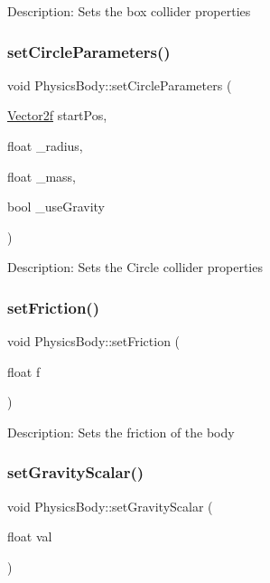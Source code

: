Description\+: Sets the box collider properties \mbox{\label{class_physics_body_a8c100c20b5a7777ba0d22886ecf878fe}} 
\subsubsection{\texorpdfstring{setCircleParameters()}{setCircleParameters()}}
{\footnotesize\ttfamily void Physics\+Body\+::set\+Circle\+Parameters (\begin{DoxyParamCaption}\item[{\mbox{\hyperlink{class_vector2f}{Vector2f}}}]{start\+Pos,  }\item[{float}]{\+\_\+radius,  }\item[{float}]{\+\_\+mass,  }\item[{bool}]{\+\_\+use\+Gravity }\end{DoxyParamCaption})}

Description\+: Sets the Circle collider properties \mbox{\label{class_physics_body_aa86a8fad1fc91b29d52ca15e1bb3a9bf}} 
\subsubsection{\texorpdfstring{setFriction()}{setFriction()}}
{\footnotesize\ttfamily void Physics\+Body\+::set\+Friction (\begin{DoxyParamCaption}\item[{float}]{f }\end{DoxyParamCaption})}

Description\+: Sets the friction of the body \mbox{\label{class_physics_body_a5975792465241daa038ff58f351a3bd0}} 
\subsubsection{\texorpdfstring{setGravityScalar()}{setGravityScalar()}}
{\footnotesize\ttfamily void Physics\+Body\+::set\+Gravity\+Scalar (\begin{DoxyParamCaption}\item[{float}]{val }\end{DoxyParamCaption})}

